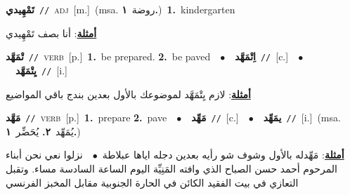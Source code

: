 \documentclass[10pt,a4paper,twoside]{article} %
\begin{document}
\begin{multicols}{2}
{\setlength\topsep{0pt}\textbf{\foreignlanguage{arabic}{تَمْهِيدي}}\ {\color{gray}\texttt{//}\color{black}}\ \textsc{adj}\ [m.]\ \color{gray}(msa. \foreignlanguage{arabic}{روضة}~\foreignlanguage{arabic}{\textbf{١.}})\color{black}\ \textbf{1.}~kindergarten\  \begin{flushright}\color{gray}\foreignlanguage{arabic}{\textbf{\underline{\foreignlanguage{arabic}{أمثلة}}}: أنا بصف تَمْهِيدي}\end{flushright}\color{black}} \vspace{2mm}

{\setlength\topsep{0pt}\textbf{\foreignlanguage{arabic}{تْمَهَّد}}\ {\color{gray}\texttt{//}\color{black}}\ \textsc{verb}\ [p.]\ \textbf{1.}~be prepared.  \textbf{2.}~be paved\ \ $\bullet$\ \ \setlength\topsep{0pt}\textbf{\foreignlanguage{arabic}{اِتْمَهَّد}}\ {\color{gray}\texttt{//}\color{black}}\ [c.]\ \ $\bullet$\ \ \setlength\topsep{0pt}\textbf{\foreignlanguage{arabic}{يِتْمَهَّد}}\ {\color{gray}\texttt{//}\color{black}}\ [i.]\  \begin{flushright}\color{gray}\foreignlanguage{arabic}{\textbf{\underline{\foreignlanguage{arabic}{أمثلة}}}: لازم يِتْمَهَّد لموضوعك بالأول بعدين بندج باقي المواضيع}\end{flushright}\color{black}} \vspace{2mm}

{\setlength\topsep{0pt}\textbf{\foreignlanguage{arabic}{مَهَّد}}\ {\color{gray}\texttt{//}\color{black}}\ \textsc{verb}\ [p.]\ \textbf{1.}~prepare  \textbf{2.}~pave\ \ $\bullet$\ \ \setlength\topsep{0pt}\textbf{\foreignlanguage{arabic}{مَهِّد}}\ {\color{gray}\texttt{//}\color{black}}\ [c.]\ \ $\bullet$\ \ \setlength\topsep{0pt}\textbf{\foreignlanguage{arabic}{يمَهِّد}}\ {\color{gray}\texttt{//}\color{black}}\ [i.]\ \color{gray}(msa. \foreignlanguage{arabic}{يُمَهِّد}~\foreignlanguage{arabic}{\textbf{٢.}}  \foreignlanguage{arabic}{يُحَضِّر}~\foreignlanguage{arabic}{\textbf{١.}})\color{black}\  \begin{flushright}\color{gray}\foreignlanguage{arabic}{\textbf{\underline{\foreignlanguage{arabic}{أمثلة}}}: مَهِّدله بالأول وشوف شو رأيه بعدين دجله اياها عبلاطة\ $\bullet$\ \  نزلوا نعي نحن أبناء المرحوم أحمد حسن الصباح الذي وافته المَنِيِّة اليوم الساعة السادسة مساء. وتقبل التعازي في بيت الفقيد الكائن في الحارة الجنوبية مقابل المخبز الفرنسي}\end{flushright}\color{black}} \vspace{2mm}


\end{multicols}
\end{document}

